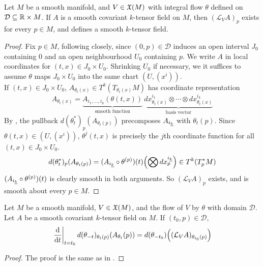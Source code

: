 \documentclass[../main-manifolds.tex]{subfiles}
\begin{document}
\begin{wts}
    Let $M$ be a smooth manifold, and $V\in \mathfrak{X}(M)$ with integral flow $\theta$ defined on $\mathcal{D}\subseteq\mathbb{R}\times M$. If $A$ is a smooth covariant $k$-tensor field on $M$, then $(\mathcal{L}_V A)_p$ exists for every $p\in M$, and defines a smooth $k$-tensor field.
\end{wts}
\begin{proof}
    Fix $p\in M$, following  closely, since $(0,p)\in\mathcal{D}$ induces an open interval $J_0$ containing $0$ and an open neighbourhood $U_0$ containing $p$. We write $A$ in local coordinates for $(t,x)\in J_0\times U_0$. Shrinking $U_0$ if necessary, we it suffices to assume $\theta$ maps $J_0\times U_0$ into the same chart $(U,(x^i))$.\\

    If $(t,x)\in J_0\times U_0$, $A_{\theta_t(x)}\in T^k(T_{\theta_t(x)}M)$ has coordinate representation
    \[
        A_{\theta_t(x)} = \underbrace{A_{i_1,\ldots, i_k}(\theta(t,x))}_{\text{smooth function}}\: \underbrace{dx^{i_1}_{\theta_t(x)}\otimes\cdots\otimes dx^{i_k}_{\theta_t(x)}}_{\text{basis vector}}
    \]
    By , the pullback $d(\theta^*_t)_{p}(A_{\theta_t(p)})$ precomposes $A_{\Ul{i}[k]}$ with $\theta_{t}(p)$. Since $\theta(t,x)\in (U,(x^i))$, $\theta^j(t,x)$ is precisely the $j$th coordinate function for all $(t,x)\in J_0\times U_0$.
    \[
        d(\theta^*_t)_{p}(A_{\theta_t(p)}) = (A_{\Ul{i}[k]}\circ \theta^{(p)}) (t)\qty(\bigotimes dx_{p}^{\Ul{i}[k]})\in T^k(T^*_pM)
    \]
    $(A_{\Ul{i}[k]}\circ \theta^{(p)}) (t)$ is clearly smooth in both arguments. So $(\mathcal{L}_V A)_p$ exists, and is smooth about every $p\in M$.
\end{proof}

\begin{wts}
    Let $M$ be a smooth manifold, $V\in\mathfrak{X}(M)$, and the flow of $V$ by $\theta$ with domain $\mathcal{D}$. Let $A$ be a smooth covariant $k$-tensor field on $M$. If $(t_0, p)\in \mathcal{D}$,
    \[
        \eval{\dv{t}}_{t=t_0} d(\theta_{-t})_{\theta_t(p)}(A_{\theta_t}(p)) = d(\theta_{-t_0})\qty((\mathcal{L}_V A)_{\theta_{t_0}(p)})
    \]
\end{wts}
\begin{proof}
    The proof is the same as in .
\end{proof}
\end{document}
